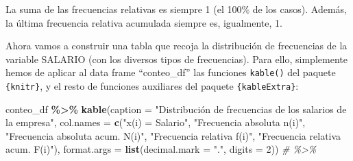 \documentclass[
]{book}
\newenvironment{Shaded}{\begin{snugshade}}{\end{snugshade}}
\newcommand{\AttributeTok}[1]{\textcolor[rgb]{0.13,0.29,0.53}{#1}}
\newcommand{\CommentTok}[1]{\textcolor[rgb]{0.56,0.35,0.01}{\textit{#1}}}
\newcommand{\DecValTok}[1]{\textcolor[rgb]{0.00,0.00,0.81}{#1}}
\newcommand{\FunctionTok}[1]{\textcolor[rgb]{0.13,0.29,0.53}{\textbf{#1}}}
\newcommand{\NormalTok}[1]{#1}
\newcommand{\SpecialCharTok}[1]{\textcolor[rgb]{0.81,0.36,0.00}{\textbf{#1}}}
\newcommand{\StringTok}[1]{\textcolor[rgb]{0.31,0.60,0.02}{#1}}
\begin{document}
La suma de las frecuencias relativas es siempre 1 (el 100\% de los casos).
Además, la última frecuencia relativa acumulada siempre es, igualmente, 1.

Ahora vamos a construir una tabla que recoja la distribución de frecuencias de la variable SALARIO (con los diversos tipos de frecuencias).
Para ello, simplemente hemos de aplicar al data frame ``conteo\_df'' las funciones \texttt{kable()} del paquete \texttt{\{knitr\}}, y el resto de funciones auxiliares del paquete \texttt{\{kableExtra\}}:

\begin{Shaded}
\begin{Highlighting}[]
\NormalTok{conteo\_df }\SpecialCharTok{\%\textgreater{}\%}
  \FunctionTok{kable}\NormalTok{(}\AttributeTok{caption =} \StringTok{"Distribución de frecuencias de los salarios de la empresa"}\NormalTok{,}
        \AttributeTok{col.names =} \FunctionTok{c}\NormalTok{(}\StringTok{"x(i) = Salario"}\NormalTok{, }\StringTok{"Frecuencia absoluta n(i)"}\NormalTok{,}
                      \StringTok{"Frecuencia absoluta acum. N(i)"}\NormalTok{, }\StringTok{"Frecuencia relativa f(i)"}\NormalTok{,}
                      \StringTok{"Frecuencia relativa acum. F(i)"}\NormalTok{),}
                      \AttributeTok{format.args =} \FunctionTok{list}\NormalTok{(}\AttributeTok{decimal.mark =} \StringTok{"."}\NormalTok{, }\AttributeTok{digits =} \DecValTok{2}\NormalTok{)) }\CommentTok{\# \%\textgreater{}\%}
\end{Highlighting}
\end{Shaded}
\end{document}
